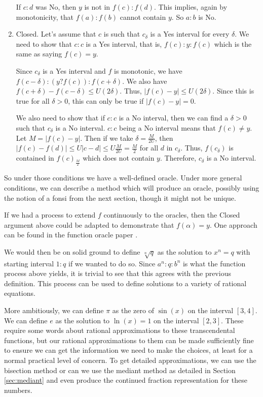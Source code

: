 \documentclass[12pt]{article}
\begin{document}
\begin{enumerate}
    If $c:d$ was No, then $y$ is not in $f(c):f(d)$. This implies, again by monotonicity, that $f(a):f(b)$ cannot contain $y$. So $a:b$ is No. 
     
    \item Closed. Let's assume that $c$ is such that $c_\delta$ is a Yes interval for every $\delta$. We need to show that $c:c$ is a Yes interval, that is, $f(c):y:f(c)$ which is the same as saying $f(c) = y$. 

    Since $c_\delta$ is a Yes interval and $f$ is monotonic, we have $f(c-\delta):(y? f(c)):f(c+\delta)$. We also have $f(c +\delta) - f(c-\delta) \leq U (2 \delta)$. Thus, $|f(c) - y| \leq U (2 \delta)$. Since this is true for all $\delta > 0$, this can only be true if $|f(c) -y| = 0$. 
    
    We also need to show that if $c:c$ is a No interval, then we can find a $\delta > 0$ such that $c_\delta$ is a No interval. $c:c$ being a No interval means that $f(c) \neq y$. Let $M = |f(c)-y|$. Then if we take $\delta = \frac{M}{2U}$, then $|f(c) - f(d)| \leq U |c-d| \leq U \frac{M}{2U} = \frac{M}{2}$ for all $d$ in $c_\delta$. Thus, $f(c_\delta)$ is contained in $f(c)_\frac{M}{2}$ which does not contain $y$. Therefore, $c_\delta$ is a No interval. 
\end{enumerate}

So under those conditions we have a well-defined oracle. Under more general conditions, we can describe a method which will produce an oracle, possibly using the notion of a fonsi from the next section, though it might not be unique.  

If we had a process to extend $f$ continuously to the oracles, then the Closed argument above could be adapted to demonstrate that $f(\alpha)=y$. One approach can be found in the function oracle  paper \cite{taylor23funora}.

We would then be on solid ground to define $\sqrt[n]{q}$ as the solution to $x^n = q$ with starting interval $1:q$ if we wanted to do so. Since $a^n : q: b^n$ is what the function process above yields, it is trivial to see that this agrees with the previous definition. This process can be used to define solutions to a variety of rational equations. 

More ambitiously, we can define $\pi$ as the zero of $\sin(x)$ on the interval $[3,4]$. We can define $e$ as the solution to  $\ln(x)=1$ on the interval $[2,3]$. These require some words about rational approximations to these transcendental functions, but our rational approximations to them can be made sufficiently fine to ensure we can get the information we need to make the choices, at least for a normal practical level of concern.  To get detailed approximations, we can use the bisection method or can we use the mediant method as detailed in Section \ref{sec:mediant} and even produce the continued fraction representation for these numbers.
 
\end{document}
